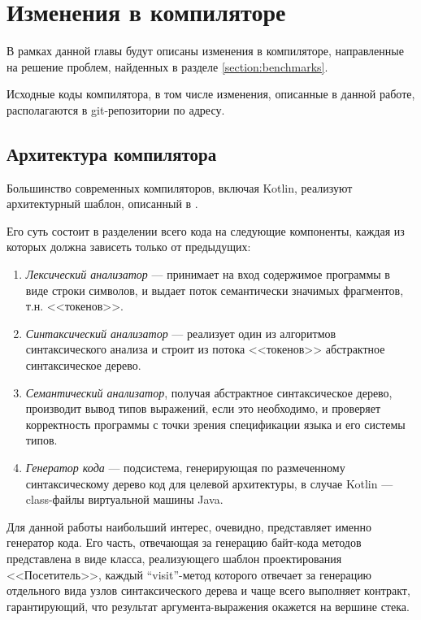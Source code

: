 \newpage
\section{Изменения в компиляторе}
В рамках данной главы будут описаны изменения в компиляторе, направленные на решение проблем,
найденных в разделе \ref{section:benchmarks}.

Исходные коды компилятора, в том числе изменения, описанные в данной работе, располагаются в
git-репозитории по адресу\cite{Kotlin}.

\subsection{Архитектура компилятора}
Большинство современных компиляторов, включая Kotlin, реализуют архитектурный шаблон, описанный
в \cite{Muchnick}.

Его суть состоит в разделении всего кода на следующие компоненты, каждая из которых должна зависеть
только от предыдущих:
\begin{enumerate}
    \item \textit{Лексический анализатор} --- принимает на вход содержимое программы в виде строки
    символов, и выдает поток семантически значимых фрагментов, т.н. <<токенов>>.

    \item \textit{Синтаксический анализатор} --- реализует один из алгоритмов синтаксического
    анализа и строит из потока <<токенов>> абстрактное синтаксическое дерево.

    \item \textit{Семантический анализатор}, получая абстрактное синтаксическое дерево, производит
    вывод типов выражений, если это необходимо, и проверяет корректность программы с точки зрения
    спецификации языка и его системы типов.

    \item \textit{Генератор кода} --- подсистема, генерирующая по размеченному синтаксическому
    дерево код для целевой архитектуры, в случае Kotlin --- class-файлы виртуальной машины Java.
\end{enumerate}

Для данной работы наибольший интерес, очевидно, представляет именно генератор кода.
Его часть, отвечающая за генерацию байт-кода методов представлена в виде класса, реализующего
шаблон проектирования <<Посетитель>>\cite{Gamma}, каждый ``visit''-метод которого отвечает за
генерацию отдельного вида узлов синтаксического дерева и чаще всего выполняет контракт,
гарантирующий, что результат аргумента-выражения окажется на вершине стека.

